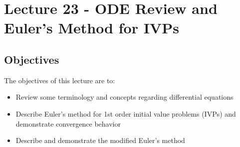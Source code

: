 \chapter{Lecture 23 - ODE Review and Euler's Method for IVPs}
\label{ch:lec23n}
\section{Objectives}
The objectives of this lecture are to:
\begin{itemize}
\item Review some terminology and concepts regarding differential equations
\item Describe Euler's method for 1st order initial value problems (IVPs) and demonstrate convergence behavior
\item Describe and demonstrate the modified Euler's method
\end{itemize}
\setcounter{lstannotation}{0}

